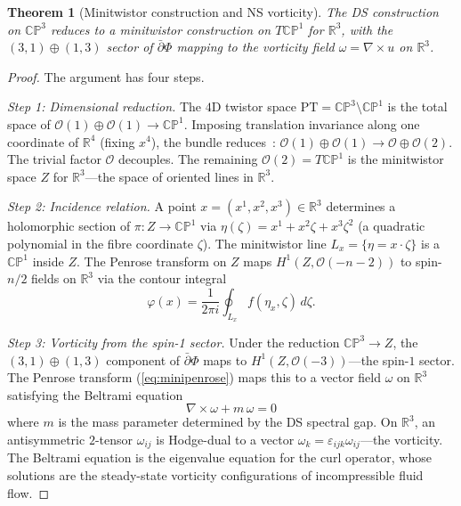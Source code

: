 \documentclass[11pt,a4paper]{article}
\newtheorem{theorem}{Theorem}[section]
\theoremstyle{definition}
\theoremstyle{remark}
\newcommand{\CP}{\mathbb{CP}}
\newcommand{\R}{\mathbb{R}}
\newcommand{\dbar}{\bar{\partial}}
\newcommand{\PT}{\mathrm{PT}}
\begin{document}
\begin{theorem}[Minitwistor construction and NS vorticity]\label{thm:minitwistor}
The DS construction on $\CP^3$ reduces to a minitwistor construction on $T\CP^1$ for $\R^3$, with the $(3,1)\oplus(1,3)$ sector of $\dbar\Phi$ mapping to the vorticity field $\omega=\nabla\times u$ on $\R^3$.
\end{theorem}

\begin{proof}
The argument has four steps.

\emph{Step 1: Dimensional reduction.} The $4$D twistor space $\PT=\CP^3\setminus\CP^1$ is the total space of $\mathcal{O}(1)\oplus\mathcal{O}(1)\to\CP^1$. Imposing translation invariance along one coordinate of $\R^4$ (fixing $x^4$), the bundle reduces~\cite{Hitchin1982}: $\mathcal{O}(1)\oplus\mathcal{O}(1)\to\mathcal{O}\oplus\mathcal{O}(2)$. The trivial factor $\mathcal{O}$ decouples. The remaining $\mathcal{O}(2)=T\CP^1$ is the minitwistor space $Z$ for $\R^3$---the space of oriented lines in $\R^3$.

\emph{Step 2: Incidence relation.} A point $x=(x^1,x^2,x^3)\in\R^3$ determines a holomorphic section of $\pi:Z\to\CP^1$ via $\eta(\zeta)=x^1+x^2\zeta+x^3\zeta^2$ (a quadratic polynomial in the fibre coordinate $\zeta$). The minitwistor line $L_x=\{\eta=x\cdot\zeta\}$ is a $\CP^1$ inside $Z$. The Penrose transform on $Z$ maps $H^1(Z,\mathcal{O}(-n-2))$ to spin-$n/2$ fields on $\R^3$ via the contour integral
\begin{equation}\label{eq:minipenrose}
\varphi(x)=\frac{1}{2\pi i}\oint_{L_x}f(\eta_x,\zeta)\,d\zeta.
\end{equation}

\emph{Step 3: Vorticity from the spin-1 sector.} Under the reduction $\CP^3\to Z$, the $(3,1)\oplus(1,3)$ component of $\dbar\Phi$ maps to $H^1(Z,\mathcal{O}(-3))$---the spin-$1$ sector. The Penrose transform (\ref{eq:minipenrose}) maps this to a vector field $\omega$ on $\R^3$ satisfying the Beltrami equation
\begin{equation}\label{eq:beltrami}
\nabla\times\omega+m\,\omega=0
\end{equation}
where $m$ is the mass parameter determined by the DS spectral gap. On $\R^3$, an antisymmetric $2$-tensor $\omega_{ij}$ is Hodge-dual to a vector $\omega_k=\varepsilon_{ijk}\omega_{ij}$---the vorticity. The Beltrami equation is the eigenvalue equation for the curl operator, whose solutions are the steady-state vorticity configurations of incompressible fluid flow.


\end{proof}
\end{document}
